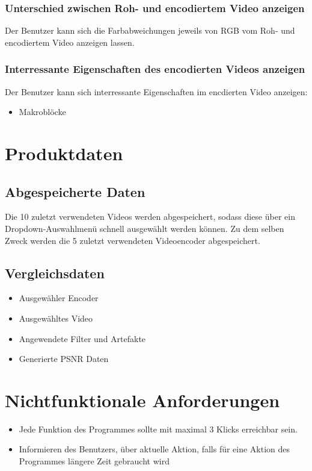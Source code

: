 \documentclass[parskip=full]{scrartcl}
\begin{document}
\subsubsection{Unterschied zwischen Roh- und encodiertem Video anzeigen}
Der Benutzer kann sich die Farbabweichungen jeweils von RGB vom Roh- und encodiertem Video anzeigen lassen.
\subsubsection{Interressante Eigenschaften des encodierten Videos anzeigen}
Der Benutzer kann sich interressante Eigenschaften im encdierten Video anzeigen:
\begin{itemize}
\item Makroblöcke
\end{itemize}
\newpage
\section{Produktdaten}
\subsection{Abgespeicherte Daten}
Die 10 zuletzt verwendeten Videos werden abgespeichert, sodass diese über ein Dropdown-Auswahlmenü schnell ausgewählt werden können. Zu dem selben Zweck werden die 5 zuletzt verwendeten Videoencoder abgespeichert.
\subsection{Vergleichsdaten}
\begin{itemize}
\item Ausgewähler Encoder
\item Ausgewähltes Video
\item Angewendete Filter und Artefakte
\item Generierte PSNR Daten
\end{itemize}
\newpage
\section{Nichtfunktionale Anforderungen}
\begin{itemize}
\item Jede Funktion des Programmes sollte mit maximal 3 Klicks erreichbar sein.
\item Informieren des Benutzers, über aktuelle Aktion, falls für eine Aktion des Programmes längere Zeit gebraucht wird
\end{itemize}
\newpage
\end{document}
